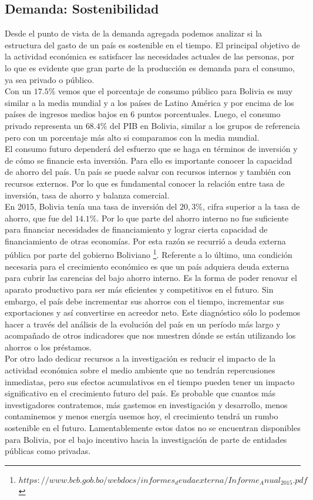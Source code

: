     \subsection{Demanda: Sostenibilidad}
    Desde el punto de vista de la demanda agregada podemos analizar si la estructura del gasto de un país es sostenible en el tiempo. El principal objetivo de la actividad económica es satisfacer las necesidades actuales de las personas, por lo que es evidente que gran parte de la producción es demanda para el consumo, ya sea privado o público.\\
    Con un $17.5\%$ vemos que el porcentaje de consumo público para Bolivia es muy similar a la media mundial y a los países de Latino América y por encima de los países de ingresos medios bajos en $6$ puntos porcentuales. Luego, el consumo privado representa un $68.4\%$ del PIB en Bolivia, similar a los grupos de referencia pero con un porcentaje más alto si comparamos con la media mundial.\\
    El consumo futuro dependerá del esfuerzo que se haga en términos de inversión y de cómo se financie esta inversión. Para ello es importante conocer la capacidad de ahorro del país. Un país se puede salvar con recursos internos y también con recursos externos. Por lo que es fundamental conocer la relación entre tasa de inversión, tasa de ahorro y balanza comercial.\\
    En 2015, Bolivia tenía una tasa de inversión del $20,3 \%$, cifra superior a la tasa de ahorro, que fue del $14.1\%$. Por lo que parte del ahorro interno no fue suficiente para financiar necesidades de financiamiento y lograr cierta capacidad de financiamiento de otras economías. Por esta razón se recurrió a deuda externa pública por parte del gobierno Boliviano \footnote{$https://www.bcb.gob.bo/webdocs/informes_deudaexterna/Informe_Anual_2015.pdf$}.
    Referente a lo último, una condición necesaria para el crecimiento económico es que un país adquiera deuda externa para cubrir las carencias del bajo ahorro interno. Es la forma de poder renovar el aparato productivo para ser más eficientes y competitivos en el futuro. Sin embargo, el país debe incrementar sus ahorros con el tiempo, incrementar sus exportaciones y así convertirse en acreedor neto. Este diagnóstico sólo lo podemos hacer a través del análisis de la evolución del país en un período más largo y acompañado de otros indicadores que nos muestren dónde se están utilizando los ahorros o los préstamos.\\
    Por otro lado dedicar recursos a la investigación es reducir el impacto de la actividad económica sobre el medio ambiente que no tendrán repercusiones inmediatas, pero sus efectos acumulativos en el tiempo pueden tener un impacto significativo en el crecimiento futuro del país. Es probable que cuantos más investigadores contratemos, más gastemos en investigación y desarrollo, menos contaminemos y menos energía usemos hoy, el crecimiento tendrá un rumbo sostenible en el futuro. Lamentablemente estos datos no se encuentran disponibles para Bolivia, por el bajo incentivo hacia la investigación de parte de entidades públicas como privadas.\\

